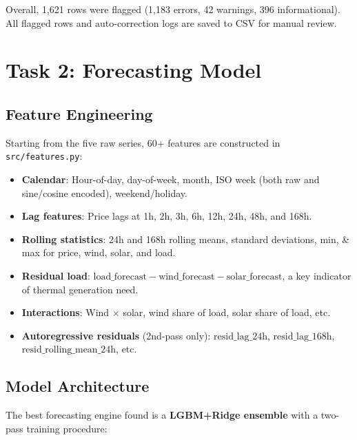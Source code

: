 \documentclass[11pt,a4paper]{article}
\begin{document}
Overall, 1{,}621 rows were flagged (1{,}183 errors, 42 warnings, 396 informational). All flagged rows and auto-correction logs are saved to CSV for manual review.


\section{Task 2: Forecasting Model}
\label{sec:task2}

\subsection{Feature Engineering}
\label{sec:features}

Starting from the five raw series, 60+ features are constructed in \texttt{src/features.py}:

\begin{itemize}[noitemsep]
  \item \textbf{Calendar}: Hour-of-day, day-of-week, month, ISO week (both raw and sine/cosine encoded), weekend/holiday.
  \item \textbf{Lag features}: Price lags at 1h, 2h, 3h, 6h, 12h, 24h, 48h, and 168h. 
  \item \textbf{Rolling statistics}: 24h and 168h rolling means, standard deviations, min, \& max for price, wind, solar, and load.
  \item \textbf{Residual load}: $\text{load\_forecast} - \text{wind\_forecast} - \text{solar\_forecast}$, a key indicator of thermal generation need.
  \item \textbf{Interactions}: Wind $\times$ solar, wind share of load, solar share of load, etc.
  \item \textbf{Autoregressive residuals} (2nd-pass only): $\text{resid\_lag\_24h}$, $\text{resid\_lag\_168h}$, $\text{resid\_rolling\_mean\_24h}$, etc.
\end{itemize}

\subsection{Model Architecture}

The best forecasting engine found is a \textbf{LGBM+Ridge ensemble} with a two-pass training procedure:
\end{document}
